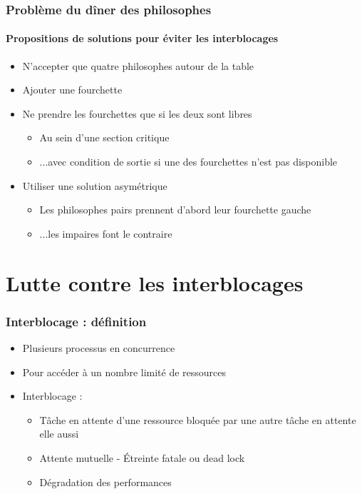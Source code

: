 \begin{frame}
\frametitle{Problème du dîner des philosophes}
\framesubtitle{Propositions de solutions pour éviter les interblocages}
\begin{itemize}
\item <1-> N’accepter que quatre philosophes autour de la table
\item <2-> Ajouter une fourchette
\item <3-> Ne prendre les fourchettes que si les deux sont libres
\begin{itemize}
\item Au sein d’une section critique
\item ...avec condition de sortie si une des fourchettes n'est pas disponible
\end{itemize}
\item <4-> Utiliser une solution asymétrique
\begin{itemize}
\item Les philosophes pairs prennent d’abord leur fourchette gauche
\item ...les impaires font le contraire
\end{itemize}
\end{itemize}
\end{frame}

\section{Lutte contre les interblocages}

\begin{frame}
\frametitle{Interblocage : définition}
\begin{itemize}
\item Plusieurs processus en concurrence
\item Pour accéder à un nombre limité de ressources
\item Interblocage : 
\begin{itemize}
\item Tâche en attente d’une ressource bloquée par une autre tâche en attente elle aussi
\item Attente mutuelle - Étreinte fatale ou dead lock
\item Dégradation des performances
\end{itemize}
\end{itemize}
\end{frame}

